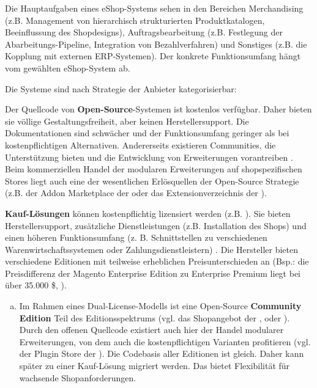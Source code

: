 \documentclass[11pt, a4paper, titlepage, listof=totoc, bibliography=totoc, index=totoc, twoside, openright, headings=normal]{scrreprt}
\begin{document}
Die Hauptaufgaben eines eShop-Systems sehen \citet{boles00} in den Bereichen Merchandising (z.B. Management von hierarchisch strukturierten Produktkatalogen, Beeinflussung des Shopdesigns), Auftragsbearbeitung (z.B. Festlegung der Abarbeitungs-Pipeline, Integration von Bezahlverfahren) und Sonstiges (z.B. die Kopplung mit externen ERP-Systemen). Der konkrete Funktionsumfang hängt vom  gewählten eShop-System ab.

Die Systeme sind nach Strategie der Anbieter kategorisierbar:
\begin{compactitem}
\item Der Quellcode von \textbf{Open-Source}-Systemen ist kostenlos verfügbar. Daher bieten sie völlige Gestaltungsfreiheit, aber keinen Herstellersupport. Die Dokumentationen sind schwächer und der Funktionsumfang geringer als bei kostenpflichtigen Alternativen. Andererseits existieren Communities, die Unterstützung bieten und die Entwicklung von Erweiterungen vorantreiben \citep{stahl15}. Beim kommerziellen Handel der modularen Erweiterungen auf shopspezifischen Stores liegt auch eine der wesentlichen Erlösquellen der Open-Source Strategie (z.B. der Addon Marketplace der \citeauthor{prestashopAddons} oder das Extensionverzeichnis der \citeauthor{opencartExtensions}).
\item \textbf{Kauf-Lösungen} können kostenpflichtig lizensiert werden (z.B. \citeauthor{shopwarePricing}). Sie bieten Herstellersupport, zusätzliche Dienstleistungen (z.B. Installation des Shops) und einen höheren Funktionsumfang (z. B. Schnittstellen zu verschiedenen Warenwirtschaftssystemen oder Zahlungsdienstleistern) \citep{stahl15}. Die Hersteller bieten verschiedene Editionen mit teilweise erheblichen Preisunterschieden an (Bsp.: die Preisdifferenz der Magento Enterprise Edition zu Enterprise Premium liegt bei über 35.000 \$, \citealp[vgl][]{fwpShop}).
\begin{enumerate}[a.]
\item Im Rahmen eines Dual-License-Modells ist eine Open-Source \textbf{Community Edition} Teil des Editionsspektrums \citep{t3n14} (vgl. das Shopangebot der \citeauthor{magentoShops}, \citeauthor{shopwarePricing} oder \citeauthor{oxidShops}). Durch den offenen Quellcode existiert auch hier der Handel modularer Erweiterungen, von dem auch die kostenpflichtigen Varianten profitieren (vgl. der Plugin Store der \citeauthor{shopwarePluginStore}). Die Codebasis aller Editionen ist gleich. Daher kann später zu einer Kauf-Lösung migriert werden. Das bietet Flexibilität für wachsende Shopanforderungen.

\end{enumerate}
\end{compactitem}
\end{document}
